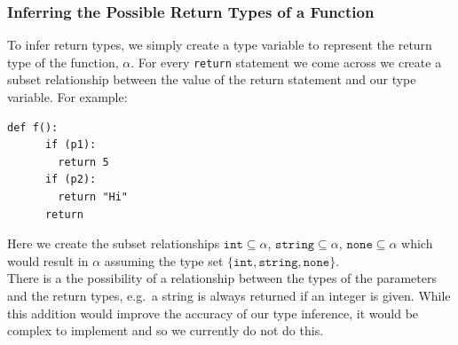 \documentclass[12pt, titlepage]{article}
\begin{document}
\subsubsection{Inferring the Possible Return Types of a Function}
To infer return types, we simply create a type variable to represent the return type of the function, $\alpha$. For every \texttt{return} statement we come across we create a subset relationship between the value of the return statement and our type variable. For example:
\begin{lstlisting}[mathescape]
    def f():
      if (p1):
        return 5
      if (p2):
        return "Hi"
      return
\end{lstlisting}
Here we create the subset relationships $\texttt{int} \subseteq \alpha$, $\texttt{string} \subseteq \alpha$, $\texttt{none} \subseteq \alpha$ which would result in $\alpha$ assuming the type set $\{\texttt{int}, \texttt{string}, \texttt{none}\}$. \\
\indent There is a the possibility of a relationship between the types of the parameters and the return types, e.g.\ a string is always returned if an integer is given. While this addition would improve the accuracy of our type inference, it would be complex to implement and so we currently do not do this.
\end{document}
